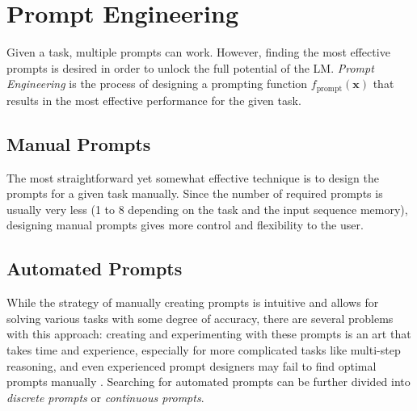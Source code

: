 \section{Prompt Engineering}
Given a task, multiple prompts can work. However, finding the most effective prompts is desired in order to unlock the full potential of the LM. \textit{Prompt Engineering} is the process of designing a prompting function $f_{\text{prompt}}(\bm{x})$ that results in the most effective performance for the given task.

\subsection{Manual Prompts}
The most straightforward yet somewhat effective technique is to design the prompts for a given task manually. Since the number of required prompts is usually very less (1 to 8 depending on the task and the input sequence memory), designing manual prompts gives more control and flexibility to the user. 

\subsection{Automated Prompts}
While the strategy of manually creating prompts is intuitive and allows for solving various tasks with some degree of accuracy, there are several problems with this approach: creating and experimenting with these prompts is an art that takes time and experience, especially for more complicated tasks like multi-step reasoning, and even experienced prompt designers may fail to find optimal prompts manually \citep{jiang-etal-2020-know}.
Searching for automated prompts can be further divided into \textit{discrete prompts} or \textit{continuous prompts}.

